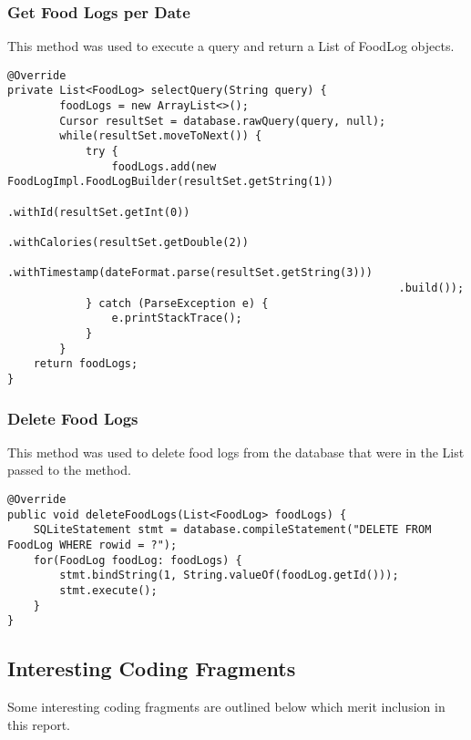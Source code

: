 \subsubsection*{Get Food Logs per Date}
This method was used to execute a query and return a List of FoodLog objects.
\begin{lstlisting}[style=Java]
@Override
private List<FoodLog> selectQuery(String query) {
        foodLogs = new ArrayList<>();
        Cursor resultSet = database.rawQuery(query, null);
        while(resultSet.moveToNext()) {
            try {
                foodLogs.add(new FoodLogImpl.FoodLogBuilder(resultSet.getString(1))
                                                            .withId(resultSet.getInt(0))
                                                            .withCalories(resultSet.getDouble(2))
                                                            .withTimestamp(dateFormat.parse(resultSet.getString(3)))
                                                            .build());
            } catch (ParseException e) {
                e.printStackTrace();
            }
        }
    return foodLogs;
}
\end{lstlisting}

\subsubsection*{Delete Food Logs}
This method was used to delete food logs from the database that were in the List passed to the method.
\begin{lstlisting}[style=Java]
@Override
public void deleteFoodLogs(List<FoodLog> foodLogs) {
    SQLiteStatement stmt = database.compileStatement("DELETE FROM FoodLog WHERE rowid = ?");
    for(FoodLog foodLog: foodLogs) {
        stmt.bindString(1, String.valueOf(foodLog.getId()));
        stmt.execute();
    }
}
\end{lstlisting}

\subsection*{Interesting Coding Fragments}
Some interesting coding fragments are outlined below which merit inclusion in this report.

